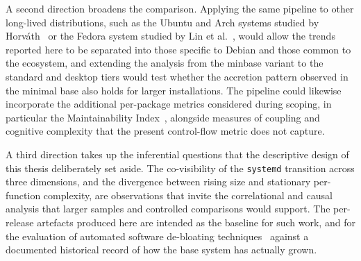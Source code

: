 A second direction broadens the comparison. Applying the same pipeline to other long-lived distributions, such as the Ubuntu and Arch systems studied by Horváth~\cite{horvath2012linuxdeps} or the Fedora system studied by Lin et al.~\cite{lin2022upstream}, would allow the trends reported here to be separated into those specific to Debian and those common to the ecosystem, and extending the analysis from the minbase variant to the standard and desktop tiers would test whether the accretion pattern observed in the minimal base also holds for larger installations. The pipeline could likewise incorporate the additional per-package metrics considered during scoping, in particular the Maintainability Index~\cite{Coleman1994Using}, alongside measures of coupling and cognitive complexity that the present control-flow metric does not capture.

A third direction takes up the inferential questions that the descriptive design of this thesis deliberately set aside. The co-visibility of the \texttt{systemd} transition across three dimensions, and the divergence between rising size and stationary per-function complexity, are observations that invite the correlational and causal analysis that larger samples and controlled comparisons would support. The per-release artefacts produced here are intended as the baseline for such work, and for the evaluation of automated software de-bloating techniques~\cite{quach2018debloating} against a documented historical record of how the base system has actually grown.
